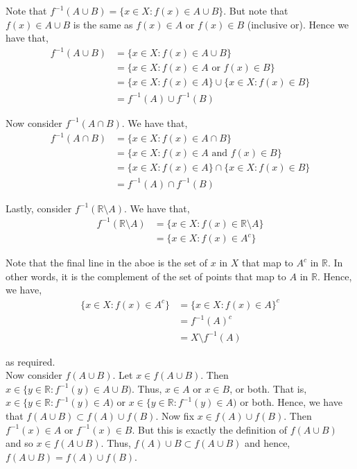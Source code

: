 \documentclass[12pt]{article}
\newenvironment{problem}[2][Problem]{\begin{trivlist}
\item[\hskip \labelsep {\bfseries #1}\hskip \labelsep {\bfseries #2.}]}{\end{trivlist}}
\begin{document}
\begin{problem}{5}
\end{problem}

Note that $f^{-1}(A \cup B) = \{x \in X: f(x) \in A \cup B\}$. But note that $f(x) \in A \cup B$ is the same as $f(x) \in A$ or $f(x) \in B$ (inclusive or). Hence we have that,
\begin{align*}
f^{-1}(A \cup B) &= \{x \in X: f(x) \in A \cup B\}\\
&= \{x \in X: f(x) \in A \text{ or } f(x) \in B\}\\
&= \{x \in X: f(x) \in A\} \cup \{x \in X: f(x) \in B\}\\
&= f^{-1}(A) \cup f^{-1}(B)
\end{align*}

Now consider $f^{-1}(A \cap B)$. We have that,
\begin{align*}
f^{-1}(A \cap B) &= \{x \in X: f(x) \in A \cap B\}\\
&= \{x \in X: f(x) \in A \text{ and } f(x) \in B\}\\
&= \{x \in X: f(x) \in A\} \cap \{x \in X: f(x) \in B\}\\
&= f^{-1}(A) \cap f^{-1}(B)
\end{align*}

Lastly, consider $f^{-1}(\mathbb{R} \setminus A)$. We have that,
\begin{align*}
f^{-1}(\mathbb{R} \setminus A) &= \{x \in X: f(x) \in \mathbb{R} \setminus A\}\\
&= \{x \in X: f(x) \in A^c\}
\end{align*}

Note that the final line in the aboe is the set of $x$ in $X$ that map to $A^c$ in $\mathbb{R}$. In other words, it is the complement of the set of points that map to $A$ in $\mathbb{R}$. Hence, we have,
\begin{align*}
\{x \in X: f(x) \in A^c\} &= \{x \in X: f(x) \in A\}^c\\
&= f^{-1}(A)^c\\
&= X \setminus f^{-1}(A)
\end{align*}

as required.\\

Now consider $f(A \cup B)$. Let $x \in f(A \cup B)$. Then $x \in \{y \in \mathbb{R}: f^{-1}(y) \in A \cup B)$. Thus, $x \in A$ or $x \in B$, or both. That is, $x \in \{y \in \mathbb{R}: f^{-1}(y) \in A)$ or $x \in \{y \in \mathbb{R}: f^{-1}(y) \in A)$ or both. Hence, we have that $f(A \cup B) \subset f(A) \cup f(B)$. Now fix $x \in f(A) \cup f(B)$. Then $f^{-1}(x) \in A$ or $f^{-1}(x) \in B$. But this is exactly the definition of $f(A \cup B)$ and so $x \in f(A \cup B)$. Thus, $f(A) \cup B \subset f(A \cup B)$ and hence, $f(A \cup B) = f(A) \cup f(B)$.\\
\end{document}
